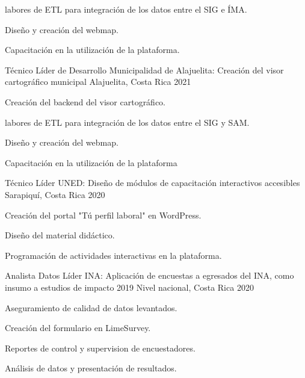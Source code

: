 \begin{cventries}
{\begin{cvitems}
    \item labores de ETL para integración de los datos entre el SIG e ÍMA.
    \item Diseño y creación del webmap.
    \item Capacitación en la utilización de la plataforma.
  \end{cvitems}
}
\cventry
{Técnico Líder de Desarrollo} %
{Municipalidad de Alajuelita: Creación del visor cartográfico municipal} %
{Alajuelita, Costa Rica} %
{2021} %
{
  \begin{cvitems} %
    \item Creación del backend del visor cartográfico.
    \item labores de ETL para integración de los datos entre el SIG y SAM.
    \item Diseño y creación del webmap.
    \item Capacitación en la utilización de la plataforma
  \end{cvitems}
}
\cventry
{Técnico Líder} %
{UNED: Diseño de módulos de capacitación interactivos accesibles} %
{Sarapiquí, Costa Rica} %
{2020} %
{
  \begin{cvitems} %
    \item Creación del portal "Tú perfil laboral" en WordPress.
    \item Diseño del material didáctico.
    \item Programación de actividades interactivas en la plataforma.
  \end{cvitems}
}
\cventry
{Analista Datos Líder} %
{INA: Aplicación de encuestas a egresados del INA, como insumo a estudios de impacto 2019} %
{Nivel nacional, Costa Rica} %
{2020} %
{
  \begin{cvitems} %
    \item Aseguramiento de calidad de datos levantados.
    \item Creación del formulario en LimeSurvey.
    \item Reportes de control y supervision de encuestadores.
    \item Análisis de datos y presentación de resultados.
  \end{cvitems}
}
\end{cventries}
